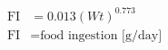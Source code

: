\documentclass[fleqn, oneside, 11pt]{article}%
\begin{document}
\begin{preview}
\begin{align*}%
\text{FI} & = 0.013(Wt)^{0.773} \nonumber \\
\text{FI} & = \text{food ingestion [g/day]} \nonumber \\
\end{align*} 
\end{preview}
\end{document}
